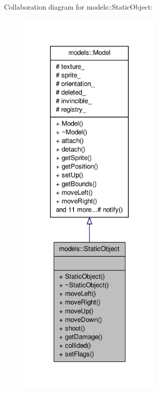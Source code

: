 \-Collaboration diagram for models\-:\-:\-Static\-Object\-:
\nopagebreak
\begin{figure}[H]
\begin{center}
\leavevmode
\includegraphics[height=550pt]{de/d1a/classmodels_1_1StaticObject__coll__graph}
\end{center}
\end{figure}
